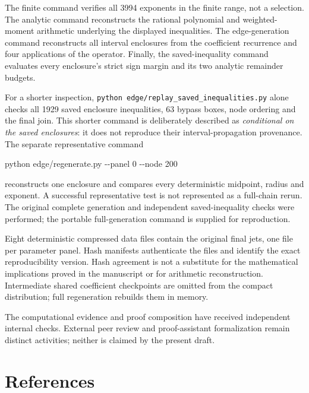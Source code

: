 \documentclass[
  11pt,
]{article}
\newenvironment{Shaded}{}{}
\newcommand{\AttributeTok}[1]{\textcolor[rgb]{0.49,0.56,0.16}{#1}}
\newcommand{\ExtensionTok}[1]{#1}
\newcommand{\NormalTok}[1]{#1}
\begin{document}
The finite command verifies all 3994 exponents in the finite range, not
a selection. The analytic command reconstructs the rational polynomial
and weighted-moment arithmetic underlying the displayed inequalities.
The edge-generation command reconstructs all interval enclosures from
the coefficient recurrence and four applications of the operator.
Finally, the saved-inequality command evaluates every enclosure's strict
sign margin and its two analytic remainder budgets.

For a shorter inspection,
\texttt{python\ edge/replay\_saved\_inequalities.py} alone checks all
1929 saved enclosure inequalities, 63 bypass boxes, node ordering and
the final join. This shorter command is deliberately described as
\emph{conditional on the saved enclosures}: it does not reproduce their
interval-propagation provenance. The separate representative command

\begin{Shaded}
\begin{Highlighting}[]
\ExtensionTok{python}\NormalTok{ edge/regenerate.py }\AttributeTok{{-}{-}panel}\NormalTok{ 0 }\AttributeTok{{-}{-}node}\NormalTok{ 200}
\end{Highlighting}
\end{Shaded}

reconstructs one enclosure and compares every deterministic midpoint,
radius and exponent. A successful representative test is not represented
as a full-chain rerun. The original complete generation and independent
saved-inequality checks were performed; the portable full-generation
command is supplied for reproduction.

Eight deterministic compressed data files contain the original final
jets, one file per parameter panel. Hash manifests authenticate the
files and identify the exact reproducibility version. Hash agreement is
not a substitute for the mathematical implications proved in the
manuscript or for arithmetic reconstruction. Intermediate shared
coefficient checkpoints are omitted from the compact distribution; full
regeneration rebuilds them in memory.

The computational evidence and proof composition have received
independent internal checks. External peer review and proof-assistant
formalization remain distinct activities; neither is claimed by the
present draft.

\clearpage

\section{References}\label{references-1}
\end{document}
